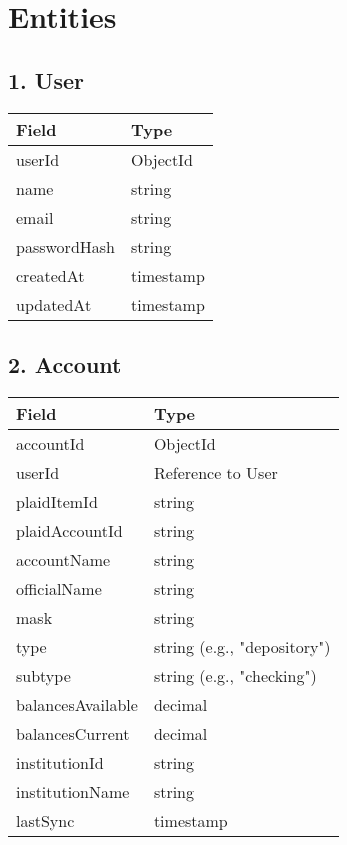 \documentclass{article}
\begin{document}
\section*{Entities}

\subsection*{1. User}
\begin{longtable}{|l|l|}
\hline
\textbf{Field} & \textbf{Type} \\ \hline
userId & ObjectId \\ \hline
name & string \\ \hline
email & string \\ \hline
passwordHash & string \\ \hline
createdAt & timestamp \\ \hline
updatedAt & timestamp \\ \hline
\end{longtable}

\subsection*{2. Account}
\begin{longtable}{|l|l|}
\hline
\textbf{Field} & \textbf{Type} \\ \hline
accountId & ObjectId \\ \hline
userId & Reference to User \\ \hline
plaidItemId & string \\ \hline
plaidAccountId & string \\ \hline
accountName & string \\ \hline
officialName & string \\ \hline
mask & string \\ \hline
type & string (e.g., "depository") \\ \hline
subtype & string (e.g., "checking") \\ \hline
balancesAvailable & decimal \\ \hline
balancesCurrent & decimal \\ \hline
institutionId & string \\ \hline
institutionName & string \\ \hline
lastSync & timestamp \\ \hline
\end{longtable}
\end{document}

